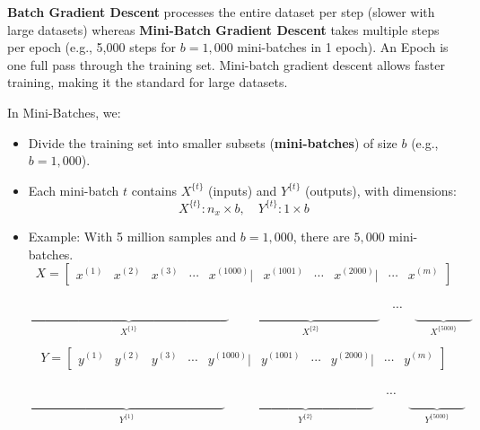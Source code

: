 \documentclass[letterpaper,12pt,notitlepage,twoside]{report}
\begin{document}
\textbf{Batch Gradient Descent} processes the entire dataset per step (slower with large datasets) whereas \textbf{Mini-Batch Gradient Descent} takes multiple steps per epoch (e.g., 5,000 steps for $b = 1,000$ mini-batches in 1 epoch). An Epoch is one full pass through the training set. Mini-batch gradient descent allows faster training, making it the standard for large datasets.

In Mini-Batches, we:
\begin{itemize}[nosep]
    \item Divide the training set into smaller subsets (\textbf{mini-batches}) of size $b$ (e.g., $b = 1,000$).
    \item Each mini-batch $t$ contains $X^{\{t\}}$ (inputs) and $Y^{\{t\}}$ (outputs), with dimensions:
    \[
    X^{\{t\}}: n_x \times b, \quad Y^{\{t\}}: 1 \times b
    \]
    \item Example: With 5 million samples and $b = 1,000$, there are $5,000$ mini-batches.
	\[
	X = 
	\begin{bmatrix}
	x^{(1)} & x^{(2)} & x^{(3)} & \cdots & x^{(1000)} | & x^{(1001)} & \cdots & x^{(2000)} | & \cdots & x^{(m)}
	\end{bmatrix}
	\]
	
	\vspace{-3.0em}

	\[
	\underbrace{\phantom{
	\begin{bmatrix}
	x^{(1)} & x^{(2)} & x^{(3)} & \cdots & x^{(1000)}
	\end{bmatrix}
	}}_{X^{\{1\}}}
	\quad
	\underbrace{\phantom{
	\begin{bmatrix}
	x^{(1001)} & \cdots & x^{(2000)}
	\end{bmatrix}
	}}_{X^{\{2\}}}
	\quad
	\cdots
	\quad
	\underbrace{\phantom{
	\begin{bmatrix}
	x^{(m)}
	\end{bmatrix}
	}}_{X^{\{5000\}}}
	\]

	\[
	Y = 
	\begin{bmatrix}
	y^{(1)} & y^{(2)} & y^{(3)} & \cdots & y^{(1000)} | & y^{(1001)} & \cdots & y^{(2000)} | & \cdots & y^{(m)}
	\end{bmatrix}
	\]
	
	\vspace{-3.0em}

	\[
	\underbrace{\phantom{
	\begin{bmatrix}
	y^{(1)} & y^{(2)} & y^{(3)} & \cdots & y^{(1000)}
	\end{bmatrix}
	}}_{Y^{\{1\}}}
	\quad
	\underbrace{\phantom{
	\begin{bmatrix}
	y^{(1001)} & \cdots & y^{(2000)}
	\end{bmatrix}
	}}_{Y^{\{2\}}}
	\quad
	\cdots
	\quad
	\underbrace{\phantom{
	\begin{bmatrix}
	y^{(m)}
	\end{bmatrix}
	}}_{Y^{\{5000\}}}
	\]
\end{itemize}
\end{document}
